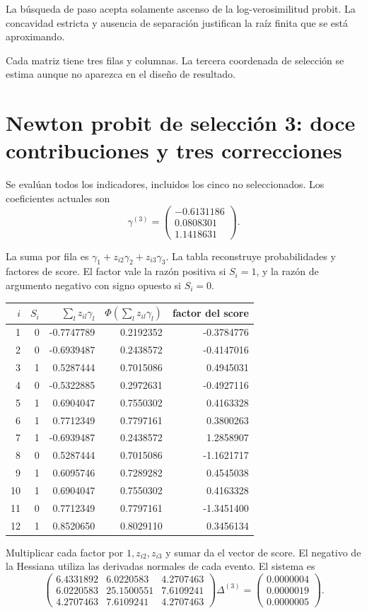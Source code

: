 \documentclass[11pt,a4paper]{article}
\begin{document}
La búsqueda de paso
acepta solamente ascenso
de la log-verosimilitud probit.
La concavidad estricta y
ausencia de separación
justifican la raíz finita
que se está aproximando.

Cada matriz tiene tres
filas y columnas.
La tercera coordenada
de selección se estima
aunque no aparezca
en el diseño de resultado.

\clearpage
\section{Newton probit de selección 3: doce contribuciones y tres correcciones}\label{unidad158}
Se evalúan todos los indicadores,
incluidos los cinco no seleccionados.
Los coeficientes actuales son
\[
\gamma^{(3)}=\begin{pmatrix}-0.6131186\\0.0808301\\1.1418631\end{pmatrix}.
\]

La suma por fila es
\(\gamma_1+z_{i2}\gamma_2+z_{i3}\gamma_3\).
La tabla reconstruye probabilidades
y factores de score.
El factor vale la razón
positiva si \(S_i=1\),
y la razón de argumento
negativo con signo opuesto
si \(S_i=0\).
\begin{center}\small\begin{tabular}{rrrrr}\toprule
\(i\)&\(S_i\)&\(\sum_lz_{il}\gamma_l\)&\(\Phi(\sum_lz_{il}\gamma_l)\)&factor del score\\\midrule
1&0&-0.7747789&0.2192352&-0.3784776\\
2&0&-0.6939487&0.2438572&-0.4147016\\
3&1&0.5287444&0.7015086&0.4945031\\
4&0&-0.5322885&0.2972631&-0.4927116\\
5&1&0.6904047&0.7550302&0.4163328\\
6&1&0.7712349&0.7797161&0.3800263\\
7&1&-0.6939487&0.2438572&1.2858907\\
8&0&0.5287444&0.7015086&-1.1621717\\
9&1&0.6095746&0.7289282&0.4545038\\
10&1&0.6904047&0.7550302&0.4163328\\
11&0&0.7712349&0.7797161&-1.3451400\\
12&1&0.8520650&0.8029110&0.3456134\\\bottomrule\end{tabular}\end{center}
Multiplicar cada factor por
\(1,z_{i2},z_{i3}\)
y sumar da el vector
de score.
El negativo de la Hessiana
utiliza las derivadas
normales de cada evento.
El sistema es
\[
\begin{pmatrix}6.4331892&6.0220583&4.2707463\\6.0220583&25.1500551&7.6109241\\4.2707463&7.6109241&4.2707463\end{pmatrix}\Delta^{(3)}=\begin{pmatrix}0.0000004\\0.0000019\\0.0000005\end{pmatrix}.
\]
\end{document}
